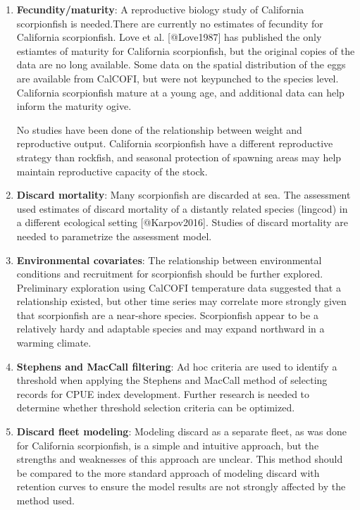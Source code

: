 \documentclass[12pt,]{article}
\begin{document}
\begin{enumerate}
\item \textbf{Fecundity/maturity}: A reproductive biology study of California 
scorpionfish is needed.There are currently no estimates of fecundity 
for California scorpionfish.  Love et al. [@Love1987] has published the only 
estiamtes of maturity for California scorpionfish, but the original copies of 
the data are no long available.  Some data on the spatial distribution of the 
eggs are available from CalCOFI, but were not keypunched to the species level. 
California scorpionfish mature at a young age, and additional data can help 
inform the maturity ogive.

No studies have been done of the relationship between weight and reproductive 
output.  California scorpionfish have a different reproductive strategy than rockfish, 
and seasonal protection of spawning areas may help maintain reproductive capacity 
of the stock.

\item \textbf{Discard mortality}: Many scorpionfish are discarded at sea. The assessment 
used estimates of discard mortality of a distantly related species (lingcod) 
in a different ecological setting [@Karpov2016]. Studies of discard mortality are needed 
to parametrize the assessment model.

\item \textbf{Environmental covariates}: The relationship between environmental 
conditions and recruitment for scorpionfish should be further explored. Preliminary 
exploration using CalCOFI temperature data suggested that a relationship existed, 
but other time series may correlate more strongly given that scorpionfish are a 
near-shore species.  Scorpionfish appear to be a relatively hardy and adaptable 
species and may expand northward in a warming climate.  


\item \textbf{Stephens and MacCall filtering}: Ad hoc criteria are used to identify 
a threshold when applying the Stephens and MacCall method of selecting records for 
CPUE index development.  Further research is needed to determine whether threshold 
selection criteria can be optimized.


\item \textbf{Discard fleet modeling}: Modeling discard as a separate fleet, as 
was done for California scorpionfish, is a simple and intuitive approach, but 
the strengths and weaknesses of this approach are unclear. This method should 
be compared to the more standard approach of modeling discard with retention 
curves to ensure the model results are not strongly affected by the method used.



\end{enumerate}
\end{document}
